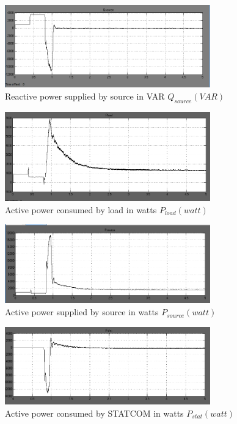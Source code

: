 \documentclass[journal,twoside]{IEEEtran}
\begin{document}
\begin{figure}[!ht]
\includegraphics[width=3.5in]{c}
\caption{Reactive power supplied by source in VAR $Q_{source}(VAR)$}
\label{fc }
\end{figure}


\begin{figure}[!ht]
\includegraphics[width=3.5in]{d}
\caption{Active power consumed by load in watts $P_{load}(watt)$}
\label{fd }
\end{figure}

\begin{figure}[!ht]
\includegraphics[width=3.5in]{e}
\caption{Active power supplied by source in watts $P_{source}(watt)$}
\label{fe }
\end{figure}


\begin{figure}[!ht]
\includegraphics[width=3.5in]{f}
\caption{Active power consumed by STATCOM in watts $P_{stat}(watt)$}
\label{ff }
\end{figure}
\end{document}
